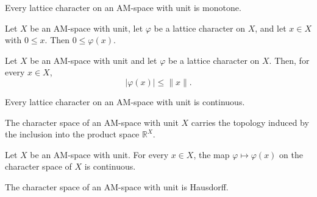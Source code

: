\begin{lemma}
\label{lem:latticeCharacter-monotone}
\leanok
{}
Every lattice character on an AM-space with unit is monotone.
\end{lemma}

\begin{lemma}
\label{lem:latticeCharacter-nonneg-apply}
\leanok
{}
Let $X$ be an AM-space with unit, let $\varphi$ be a lattice
character on $X$, and let $x \in X$ with $0 \le x$. Then
$0 \le \varphi(x)$.
\end{lemma}

\begin{lemma}
\label{lem:latticeCharacter-abs-apply-le-norm}
\leanok
{}
Let $X$ be an AM-space with unit and let $\varphi$ be a lattice
character on $X$. Then, for every $x \in X$,
\[
  \lvert \varphi(x)\rvert \le \lVert x\rVert.
\]
\end{lemma}

\begin{theorem}
\label{thm:latticeCharacter-continuous}
\leanok
{}
Every lattice character on an AM-space with unit is continuous.
\end{theorem}

\begin{definition}
\label{def:latticeCharacter-topology}
\leanok
{}
The character space of an AM-space with unit $X$ carries the
topology induced by the inclusion into the product space
$\mathbb{R}^{X}$.
\end{definition}

\begin{lemma}
\label{lem:latticeCharacter-continuous-eval}
\leanok
{}
Let $X$ be an AM-space with unit. For every $x \in X$, the map
$\varphi \mapsto \varphi(x)$ on the character space of $X$ is
continuous.
\end{lemma}

\begin{theorem}
\label{thm:latticeCharacter-t2Space}
\leanok
{}
The character space of an AM-space with unit is Hausdorff.
\end{theorem}

